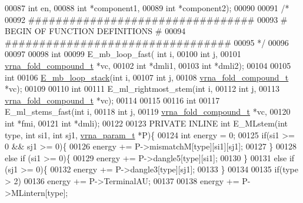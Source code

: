 \begin{DoxyCode}
00087                 \textcolor{keywordtype}{int} en,
00088                 \textcolor{keywordtype}{int} *component1,
00089                 \textcolor{keywordtype}{int} *component2);
00090 
00091 \textcolor{comment}{/*}
00092 \textcolor{comment}{#################################}
00093 \textcolor{comment}{# BEGIN OF FUNCTION DEFINITIONS #}
00094 \textcolor{comment}{#################################}
00095 \textcolor{comment}{*/}
00096 
00097 
00098 \textcolor{keywordtype}{int}
00099 E\_mb\_loop\_fast( \textcolor{keywordtype}{int} i,
00100                 \textcolor{keywordtype}{int} j,
00101                 \hyperlink{group__fold__compound_structvrna__fc__s}{vrna\_fold\_compound\_t} *vc,
00102                 \textcolor{keywordtype}{int} *dmli1,
00103                 \textcolor{keywordtype}{int} *dmli2);
00104 
00105 \textcolor{keywordtype}{int}
00106 \hyperlink{group__loops_ga81d73d23f480f84df8cfd0042c032503}{E\_mb\_loop\_stack}(\textcolor{keywordtype}{int} i,
00107                 \textcolor{keywordtype}{int} j,
00108                 \hyperlink{group__fold__compound_structvrna__fc__s}{vrna\_fold\_compound\_t} *vc);
00109 
00110 \textcolor{keywordtype}{int}
00111 E\_ml\_rightmost\_stem(\textcolor{keywordtype}{int} i,
00112                     \textcolor{keywordtype}{int} j,
00113                     \hyperlink{group__fold__compound_structvrna__fc__s}{vrna\_fold\_compound\_t} *vc);
00114 
00115 
00116 \textcolor{keywordtype}{int}
00117 E\_ml\_stems\_fast(\textcolor{keywordtype}{int} i,
00118                 \textcolor{keywordtype}{int} j,
00119                 \hyperlink{group__fold__compound_structvrna__fc__s}{vrna\_fold\_compound\_t} *vc,
00120                 \textcolor{keywordtype}{int} *fmi,
00121                 \textcolor{keywordtype}{int} *dmli);
00122 
00123 PRIVATE INLINE \textcolor{keywordtype}{int} E\_MLstem(\textcolor{keywordtype}{int} type, \textcolor{keywordtype}{int} si1, \textcolor{keywordtype}{int} sj1, \hyperlink{group__energy__parameters_structvrna__param__s}{vrna\_param\_t} *P)\{
00124   \textcolor{keywordtype}{int} energy = 0;
00125   \textcolor{keywordflow}{if}(si1 >= 0 && sj1 >= 0)\{
00126     energy += P->mismatchM[type][si1][sj1];
00127   \}
00128   \textcolor{keywordflow}{else} \textcolor{keywordflow}{if} (si1 >= 0)\{
00129     energy += P->dangle5[type][si1];
00130   \}
00131   \textcolor{keywordflow}{else} \textcolor{keywordflow}{if} (sj1 >= 0)\{
00132     energy += P->dangle3[type][sj1];
00133   \}
00134 
00135   \textcolor{keywordflow}{if}(type > 2)
00136     energy += P->TerminalAU;
00137 
00138   energy += P->MLintern[type];

\end{DoxyCode}
